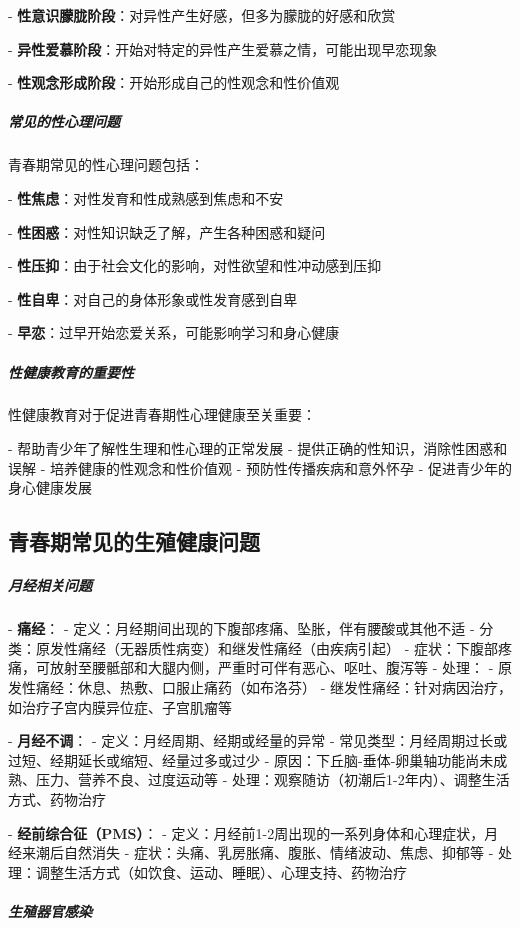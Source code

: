 \begin{enumerate}
- \textbf{性意识朦胧阶段}：对异性产生好感，但多为朦胧的好感和欣赏

- \textbf{异性爱慕阶段}：开始对特定的异性产生爱慕之情，可能出现早恋现象

- \textbf{性观念形成阶段}：开始形成自己的性观念和性价值观

\subparagraph{常见的性心理问题}

青春期常见的性心理问题包括：

- \textbf{性焦虑}：对性发育和性成熟感到焦虑和不安

- \textbf{性困惑}：对性知识缺乏了解，产生各种困惑和疑问

- \textbf{性压抑}：由于社会文化的影响，对性欲望和性冲动感到压抑

- \textbf{性自卑}：对自己的身体形象或性发育感到自卑

- \textbf{早恋}：过早开始恋爱关系，可能影响学习和身心健康

\subparagraph{性健康教育的重要性}

性健康教育对于促进青春期性心理健康至关重要：

- 帮助青少年了解性生理和性心理的正常发展
- 提供正确的性知识，消除性困惑和误解
- 培养健康的性观念和性价值观
- 预防性传播疾病和意外怀孕
- 促进青少年的身心健康发展

\subsection{青春期常见的生殖健康问题}

\subparagraph{月经相关问题}

- \textbf{痛经}：
  - 定义：月经期间出现的下腹部疼痛、坠胀，伴有腰酸或其他不适
  - 分类：原发性痛经（无器质性病变）和继发性痛经（由疾病引起）
  - 症状：下腹部疼痛，可放射至腰骶部和大腿内侧，严重时可伴有恶心、呕吐、腹泻等
  - 处理：
    - 原发性痛经：休息、热敷、口服止痛药（如布洛芬）
    - 继发性痛经：针对病因治疗，如治疗子宫内膜异位症、子宫肌瘤等

- \textbf{月经不调}：
  - 定义：月经周期、经期或经量的异常
  - 常见类型：月经周期过长或过短、经期延长或缩短、经量过多或过少
  - 原因：下丘脑-垂体-卵巢轴功能尚未成熟、压力、营养不良、过度运动等
  - 处理：观察随访（初潮后1-2年内）、调整生活方式、药物治疗

- \textbf{经前综合征（PMS）}：
  - 定义：月经前1-2周出现的一系列身体和心理症状，月经来潮后自然消失
  - 症状：头痛、乳房胀痛、腹胀、情绪波动、焦虑、抑郁等
  - 处理：调整生活方式（如饮食、运动、睡眠）、心理支持、药物治疗

\subparagraph{生殖器官感染}


\end{enumerate}
